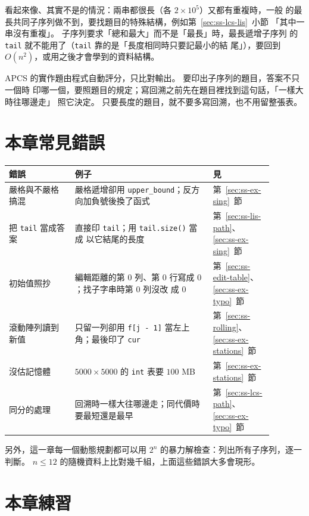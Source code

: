 看起來像、其實不是的情況：兩串都很長（各 $2 \times 10^5$）又都有重複時，一般
的最長共同子序列做不到，要找題目的特殊結構，例如第~\ref{sec:ss-lcs-lis}~小節
「其中一串沒有重複」。 子序列要求「總和最大」而不是「最長」時，最長遞增子序列
的 \texttt{tail} 就不能用了（\texttt{tail} 靠的是「長度相同時只要記最小的結
尾」），要回到 $O(n^2)$，或用之後才會學到的資料結構。

\begin{apcsnote}
APCS 的實作題由程式自動評分，只比對輸出。 要印出子序列的題目，答案不只一個時
印哪一個，要照題目的規定；寫回溯之前先在題目裡找到這句話，「一樣大時往哪邊走」
照它決定。 只要長度的題目，就不要多寫回溯，也不用留整張表。
\end{apcsnote}

\section{本章常見錯誤}
\label{sec:ss-pitfalls}

\begin{center}
\begin{tabular}{p{0.22\linewidth}p{0.46\linewidth}p{0.2\linewidth}}
\toprule
錯誤 & 例子 & 見 \\
\midrule
嚴格與不嚴格搞混 & 嚴格遞增卻用 \texttt{upper\_bound}；反方向加負號後換了函式 &
第~\ref{sec:ss-ex-sing}~節 \\
把 \texttt{tail} 當成答案 & 直接印 \texttt{tail}；用 \texttt{tail.size()} 當成
以它結尾的長度 & 第~\ref{sec:ss-lis-path}、\ref{sec:ss-ex-sing}~節 \\
初始值照抄 & 編輯距離的第 $0$ 列、第 $0$ 行寫成 $0$；找子字串時第 $0$ 列沒改
成 $0$ & 第~\ref{sec:ss-edit-table}、\ref{sec:ss-ex-typo}~節 \\
滾動陣列讀到新值 & 只留一列卻用 \texttt{f[j - 1]} 當左上角；最後印了
\texttt{cur} & 第~\ref{sec:ss-rolling}、\ref{sec:ss-ex-stations}~節 \\
沒估記憶體 & $5000 \times 5000$ 的 \texttt{int} 表要 $100$ MB &
第~\ref{sec:ss-ex-stations}~節 \\
同分的處理 & 回溯時一樣大往哪邊走；同代價時要最短還是最早 &
第~\ref{sec:ss-lcs-path}、\ref{sec:ss-ex-typo}~節 \\
\bottomrule
\end{tabular}
\end{center}

另外，這一章每一個動態規劃都可以用 $2^n$ 的暴力解檢查：列出所有子序列，逐一
判斷。 $n \le 12$ 的隨機資料上比對幾千組，上面這些錯誤大多會現形。

\section{本章練習}
\label{sec:ss-exercises}

